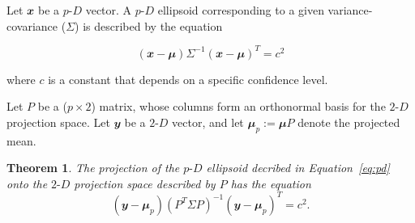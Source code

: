 \documentclass[
  12pt,
]{interact}
\newcommand\pD{$p\text{-}D$}
\newcommand\gD{$2\text{-}D$}
\newtheorem*{theorem}{Theorem}
\begin{document}
Let \(\mathbfit{x}\) be a \pD{} vector. A \pD{} ellipsoid corresponding
to a given variance-covariance (\(\Sigma\)) is described by the equation

\begin{equation}
(\mathbfit{x}-\mathbfit{\mu}) \Sigma^{-1}(\mathbfit{x}-\mathbfit{\mu})^T = c^2
\label{eq:pd}
\end{equation}

where \(c\) is a constant that depends on a specific confidence level.

Let \(P\) be a (\(p\times 2\)) matrix, whose columns form an orthonormal
basis for the \gD{} projection space. Let \(\mathbfit{y}\) be a \gD{}
vector, and let \(\mathbfit{\mu}_p := \mathbfit{\mu} P\) denote the
projected mean.

\begin{theorem}
  The projection of the \pD{} ellipsoid decribed in Equation~\ref{eq:pd} onto the \gD{} projection space described by $P$ has the equation
\begin{equation}
(\mathbfit{y} - \mathbfit{\mu}_p)(P^T \Sigma P)^{-1}(\mathbfit{y} - \mathbfit{\mu}_p)^T = c^2.
\end{equation}
\end{theorem}
\end{document}
